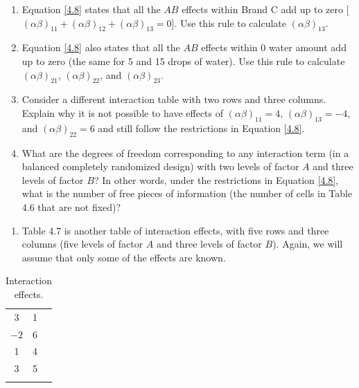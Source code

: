 \documentclass[
]{report}
\providecommand{\tightlist}{%
  \setlength{\itemsep}{0pt}\setlength{\parskip}{0pt}}
\begin{document}
\begin{enumerate}
\def\labelenumi{\alph{enumi}.}
\item
  Equation \ref{4.8} states that all the \(AB\) effects within Brand C add up to zero {[}\((\alpha\beta)_{11} + (\alpha\beta)_{12} + (\alpha\beta)_{13} = 0\){]}. Use this rule to calculate \((\alpha\beta)_{13}\).
\item
  Equation \ref{4.8} also states that all the \(AB\) effects within 0 water amount add up to zero (the same for 5 and 15 drops of water). Use this rule to calculate \((\alpha\beta)_{21}\), \((\alpha\beta)_{22}\), and \((\alpha\beta)_{23}\).
\item
  Consider a different interaction table with two rows and three columns. Explain why it is not possible to have effects of \((\alpha\beta)_{11} = 4\), \((\alpha\beta)_{13} = -4\), and \((\alpha\beta)_{22} = 6\) and still follow the restrictions in Equation \ref{4.8}.
\item
  What are the degrees of freedom corresponding to any interaction term (in a balanced completely randomized design) with two levels of factor \(A\) and three levels of factor \(B\)? In other words, under the restrictions in Equation \ref{4.8}, what is the number of free pieces of information (the number of cells in Table 4.6 that are not fixed)?
\end{enumerate}

\begin{enumerate}
\def\labelenumi{\arabic{enumi}.}
\setcounter{enumi}{31}
\tightlist
\item
  Table 4.7 is another table of interaction effects, with five rows and three columns (five levels of factor \(A\) and three levels of factor \(B\)). Again, we will assume that only some of the effects are known.
\end{enumerate}

\begin{table}[!h]
\centering
\caption{\label{tab:tab47}Interaction effects.}
\centering
\begin{tabular}[t]{ccc}
\toprule
  &   &  \\
\midrule
3 & 1 & \\
$-2$ & 6 & \\
1 & 4 & \\
3 & 5 & \\
 &  & \\
\bottomrule
\end{tabular}
\end{table}
\end{document}
